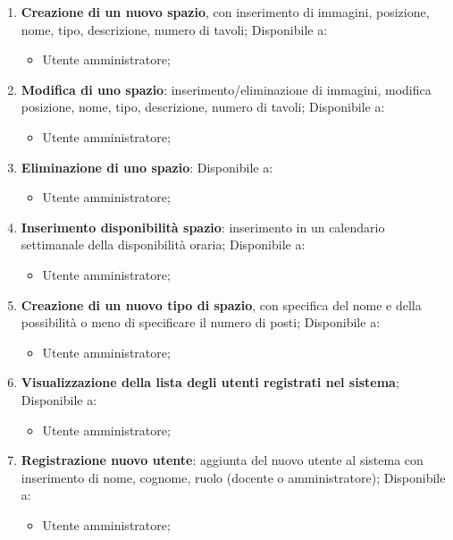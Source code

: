 \begin{enumerate}
	\item \textbf{Creazione di un nuovo spazio}, con inserimento di immagini,
	      posizione, nome, tipo, descrizione, numero di tavoli; Disponibile a:
	      \begin{itemize}
		      \item Utente amministratore;
	      \end{itemize}

	\item \textbf{Modifica di uno spazio}: inserimento/eliminazione di immagini,
	      modifica posizione, nome, tipo, descrizione, numero di tavoli; Disponibile
	      a:
	      \begin{itemize}
		      \item Utente amministratore;
	      \end{itemize}

	\item \textbf{Eliminazione di uno spazio}: Disponibile a:
	      \begin{itemize}
		      \item Utente amministratore;
	      \end{itemize}

	\item \textbf{Inserimento disponibilità spazio}: inserimento in un
	      calendario settimanale della disponibilità oraria; Disponibile a:
	      \begin{itemize}
		      \item Utente amministratore;
	      \end{itemize}

	\item \textbf{Creazione di un nuovo tipo di spazio}, con specifica del nome
	      e della possibilità o meno di specificare il numero di posti; Disponibile
	      a:
	      \begin{itemize}
		      \item Utente amministratore;
	      \end{itemize}

	\item \textbf{Visualizzazione della lista degli utenti registrati nel
		      sistema}; Disponibile a:
	      \begin{itemize}
		      \item Utente amministratore;
	      \end{itemize}

	\item \textbf{Registrazione nuovo utente}: aggiunta del nuovo utente al
	      sistema con inserimento di nome, cognome, ruolo (docente o amministratore);
	      Disponibile a:
	      \begin{itemize}
		      \item Utente amministratore;
	      \end{itemize}


\end{enumerate}
